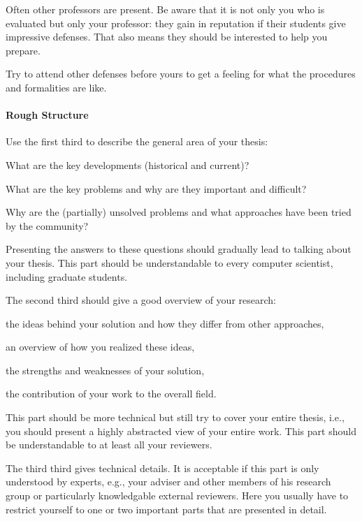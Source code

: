 \documentclass[12pt]{article}
\begin{document}
Often other professors are present.
Be aware that it is not only you who is evaluated but only your professor: they gain in reputation if their students give impressive defenses.
That also means they should be interested to help you prepare. 
\medskip

Try to attend other defenses before yours to get a feeling for what the procedures and formalities are like.

\paragraph{Rough Structure}
Use the first third to describe the general area of your thesis:
\begin{compactitem}
 \item What are the key developments (historical and current)?
 \item What are the key problems and why are they important and difficult?
 \item Why are the (partially) unsolved problems and what approaches have been tried by the community?
\end{compactitem}
Presenting the answers to these questions should gradually lead to talking about your thesis.
This part should be understandable to every computer scientist, including graduate students.
\medskip

The second third should give a good overview of your research:
\begin{compactitem}
 \item the ideas behind your solution and how they differ from other approaches,
 \item an overview of how you realized these ideas,
 \item the strengths and weaknesses of your solution,
 \item the contribution of your work to the overall field.
\end{compactitem}
This part should be more technical but still try to cover your entire thesis, i.e., you should present a highly abstracted view of your entire work.
This part should be understandable to at least all your reviewers.
\medskip

The third third gives technical details.
It is acceptable if this part is only understood by experts, e.g., your adviser and other members of his research group or particularly knowledgable external reviewers.
Here you usually have to restrict yourself to one or two important parts that are presented in detail.
\medskip
\end{document}
